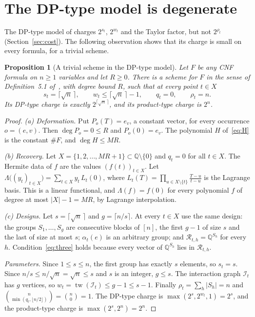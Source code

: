 \documentclass[11pt,a4paper]{article}
\newtheorem{proposition}[theorem]{Proposition}
\theoremstyle{definition}
\theoremstyle{remark}
\newcommand{\Q}{\mathbb{Q}}
\newcommand{\cR}{\mathcal{R}}
\newcommand{\cI}{\mathcal{I}}
\newcommand{\tw}{\operatorname{tw}}
\begin{document}
\section{The DP-type model is degenerate}\label{sec:dp}

The DP-type model of \cite[Section~5.2]{DL} charges $2^{s_t}$, $2^{w_t}$ and the Taylor
factor, but not $2^{\rho_t}$ (Section~\ref{sec:cost}). The following observation shows that
its charge is small on every formula, for a trivial scheme.

\begin{proposition}[A trivial scheme in the DP-type model]\label{prop:dp}
Let $F$ be any CNF formula on $n\ge1$ variables and let $R\ge0$. There is a scheme for $F$ in
the sense of Definition~5.1 of~\cite{DL}, with degree bound $R$, such that at every point
$t\in X$
\[
s_t=\lceil\sqrt n\,\rceil,\qquad w_t\le\lceil\sqrt n\,\rceil-1,\qquad q_t=0,\qquad\rho_t=n .
\]
Its DP-type charge is exactly $2^{\lceil\sqrt n\,\rceil}$, and its product-type charge is
$2^n$.
\end{proposition}

\begin{proof}
\emph{(a) Deformation.} Put $P_o(T)=e_v$, a constant vector, for every occurrence $o=(e,v)$.
Then $\deg P_o=0\le R$ and $P_o(0)=e_v$. The polynomial $H$ of~\eqref{eq:H} is the constant
$\#F$, and $\deg H\le MR$.

\emph{(b) Recovery.} Let $X=\{1,2,\dots,MR+1\}\subset\Q\setminus\{0\}$ and $q_t=0$ for all
$t\in X$. The Hermite data of $f$ are the values $(f(t))_{t\in X}$. Let
$\Lambda\bigl((y_t)_{t\in X}\bigr)=\sum_{t\in X}y_t\,L_t(0)$, where
$L_t(T)=\prod_{u\in X\setminus\{t\}}\frac{T-u}{t-u}$ is the Lagrange basis. This is a linear
functional, and $\Lambda(f)=f(0)$ for every polynomial $f$ of degree at most $|X|-1=MR$, by
Lagrange interpolation.

\emph{(c) Designs.} Let $s=\lceil\sqrt n\,\rceil$ and $g=\lceil n/s\rceil$. At every $t\in X$
use the same design: the groups $S_1,\dots,S_g$ are consecutive blocks of $[n]$, the first
$g-1$ of size $s$ and the last of size at most $s$; $\alpha_t(e)$ is an arbitrary group; and
$\cR_{t,h}=\Q^{S_h}$ for every $h$. Condition~\eqref{eq:three} holds because every vector of
$\Q^{S_h}$ lies in $\cR_{t,h}$.

\emph{Parameters.} Since $1\le s\le n$, the first group has exactly $s$ elements, so $s_t=s$.
Since $n/s\le n/\sqrt n=\sqrt n\le s$ and $s$ is an integer, $g\le s$. The interaction graph
$\cI_t$ has $g$ vertices, so $w_t=\tw(\cI_t)\le g-1\le s-1$. Finally
$\rho_t=\sum_h|S_h|=n$ and $\binom{n}{\min(q_t,\lfloor n/2\rfloor)}=\binom n0=1$. The DP-type
charge is $\max(2^{s},2^{w_t},1)=2^{s}$, and the product-type charge is
$\max(2^s,2^{n})=2^n$.
\end{proof}
\end{document}
